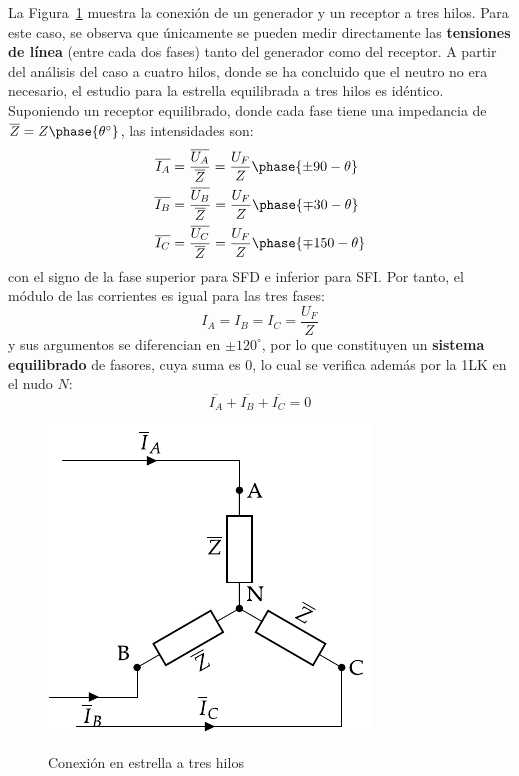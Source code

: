 	
	
	La Figura~\ref{fig.conexion_estrella_3} muestra la conexión de un generador y un receptor a tres hilos. Para este caso, se observa que únicamente se pueden medir directamente las \textbf{tensiones de línea} (entre cada dos fases) tanto del generador como del receptor. A partir del análisis del caso a cuatro hilos, donde se ha concluido que el neutro no era necesario, el estudio para la estrella equilibrada a tres hilos es idéntico. Suponiendo un receptor equilibrado, donde cada fase tiene una impedancia de $\overline{Z}=Z\phase{\theta^\circ}$, las intensidades son:
	\begin{align*}
      \overline{I_A} &= \frac{\overline{U_A}}{\overline{Z}} = \frac{U_F}{Z}\phase{{\pm 90} - \theta} \\
      \overline{I_B} &= \frac{\overline{U_B}}{\overline{Z}} = \frac{U_F}{Z}\phase{{\mp 30} - \theta}\\
      \overline{I_C} &= \frac{\overline{U_C}}{\overline{Z}} = \frac{U_F}{Z}\phase{{\mp 150} - \theta}
    \end{align*}
    con el signo de la fase superior para SFD e inferior para SFI. Por tanto, el módulo de las corrientes es igual para las tres fases: 
    \begin{equation}
        \boxed{I_A = I_B = I_C = \dfrac{U_F}{Z}}
    \end{equation}
    y sus argumentos se diferencian en $\pm120^\circ$, por lo que constituyen un \textbf{sistema equilibrado} de fasores, cuya suma es 0, lo cual se verifica además por la 1LK en el nudo $N$: 
    \begin{equation*}
        \overline{I_A}  + \overline{I_B} + \overline{I_C} = 0
    \end{equation*}
	\begin{figure}[H]
		\centering
		{\includegraphics{../figs/EstrellaEquilibrado_Receptor_SN.pdf}}
		\caption{Conexión en estrella a tres hilos}
		\label{fig.conexion_estrella_3}
	\end{figure}


